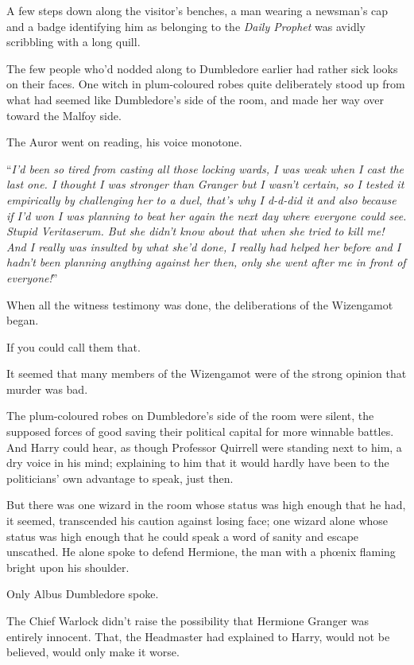 A few steps down along the visitor’s benches, a man wearing a newsman’s cap and a badge identifying him as belonging to the \emph{Daily Prophet} was avidly scribbling with a long quill.

The few people who’d nodded along to Dumbledore earlier had rather sick looks on their faces. One witch in plum-coloured robes quite deliberately stood up from what had seemed like Dumbledore’s side of the room, and made her way over toward the Malfoy side.

The Auror went on reading, his voice monotone.

“\emph{I’d been so tired from casting all those locking wards, I was weak when I cast the last one. I thought I was stronger than Granger but I wasn’t certain, so I tested it empirically by challenging her to a duel, that’s why I d-d-did it and also because if I’d won I was planning to beat her again the next day where everyone could see. Stupid Veritaserum. But \emph{she} didn’t know about that when she tried to \emph{kill} me! And I really was insulted by what she’d done, I really had helped her before and I hadn’t been planning anything against her then, only \emph{she} went after \emph{me} in front of everyone!}”

When all the witness testimony was done, the deliberations of the Wizengamot began.

If you could call them that.

It seemed that many members of the Wizengamot were of the strong opinion that murder was bad.

The plum-coloured robes on Dumbledore’s side of the room were silent, the supposed forces of good saving their political capital for more winnable battles. And Harry could hear, as though Professor Quirrell were standing next to him, a dry voice in his mind; explaining to him that it would hardly have been to the politicians’ own advantage to speak, just then.

But there was one wizard in the room whose status was high enough that he had, it seemed, transcended his caution against losing face; one wizard alone whose status was high enough that he could speak a word of sanity and escape unscathed. He alone spoke to defend Hermione, the man with a phœnix flaming bright upon his shoulder.

Only Albus Dumbledore spoke.

The Chief Warlock didn’t raise the possibility that Hermione Granger was entirely innocent. That, the Headmaster had explained to Harry, would not be believed, would only make it worse.

